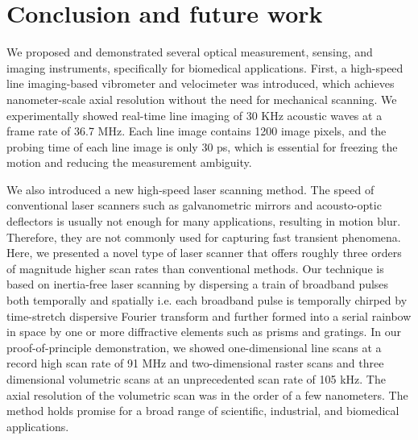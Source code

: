 \chapter{Conclusion and future work}
\label{chp:CONCLU_Chapter}

We proposed and demonstrated several optical measurement, sensing, and imaging instruments, specifically for biomedical applications. First, a high-speed line imaging-based vibrometer and velocimeter was introduced, which achieves nanometer-scale axial resolution without the need for mechanical scanning. We experimentally showed real-time line imaging of 30 KHz acoustic waves at a frame rate of 36.7 MHz. Each line image contains 1200 image pixels, and the probing time of each line image is only 30 ps, which is essential for freezing the motion and reducing the measurement ambiguity.

We also introduced a new high-speed laser scanning method. The speed of conventional laser scanners such as galvanometric mirrors and acousto-optic deflectors is usually not enough for many applications, resulting in motion blur. Therefore, they are not commonly used for capturing fast transient phenomena. Here, we presented a novel type of laser scanner that offers roughly three orders of magnitude higher scan rates than conventional methods. Our technique is based on inertia-free laser scanning by dispersing a train of broadband pulses both temporally and spatially i.e. each broadband pulse is temporally chirped by time-stretch dispersive Fourier transform and further formed into a serial rainbow in space by one or more diffractive elements such as prisms and gratings. In our proof-of-principle demonstration, we showed one-dimensional line scans at a record high scan rate of 91 MHz and two-dimensional raster scans and three dimensional volumetric scans at an unprecedented scan rate of 105 kHz. The axial resolution of the volumetric scan was in the order of a few nanometers. The method holds promise for a broad range of scientific, industrial, and biomedical applications.

